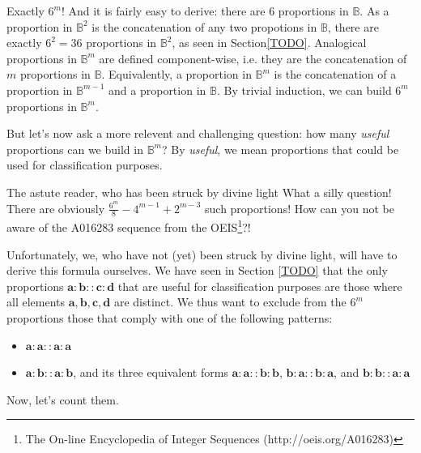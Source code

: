 Exactly $6^m$! And it is fairly easy to derive: there are $6$ proportions in
$\mathbb{B}$. As a proportion in $\mathbb{B}^2$ is the concatenation of any two
propotions in $\mathbb{B}$, there are exactly $6^2 = 36$ proportions in
$\mathbb{B}^2$, as seen in Section\ref{TODO}. Analogical proportions in
$\mathbb{B}^m$ are defined component-wise, i.e. they are the concatenation of
$m$ proportions in $\mathbb{B}$. Equivalently, a proportion in
$\mathbb{B}^m$ is the concatenation of a proportion in $\mathbb{B}^{m - 1}$ and
a proportion in $\mathbb{B}$. By trivial induction, we can build $6^m$
proportions in $\mathbb{B}^m$.

But let's now ask a more relevent and challenging question: how many
\textit{useful} proportions can we build in $\mathbb{B}^m$? By \textit{useful},
we mean proportions that could be used for classification purposes.

\begin{aquote}{The astute reader, who has been struck by divine light}
  What a silly question! There are obviously $\frac{6^m}{8} - 4^{m - 1} + 2^{m
  - 3}$ such proportions! How can you not be aware of the A016283 sequence from
  the OEIS\footnote{The On-line Encyclopedia of Integer Sequences
  (http://oeis.org/A016283)}?!
\end{aquote}

Unfortunately, we, who have not (yet) been struck by divine light, will have to
derive this formula ourselves. We have seen in Section \ref{TODO} that the only
proportions $\mathbf{a} : \mathbf{b} :: \mathbf{c} : \mathbf{d}$ that are
useful for classification purposes are those where all elements $\mathbf{a},
\mathbf{b}, \mathbf{c}, \mathbf{d}$ are distinct. We thus want to exclude from
the $6^m$ proportions those that comply with one of the following patterns:

\begin{itemize}
  \item $\mathbf{a}: \mathbf{a} :: \mathbf{a} : \mathbf{a}$
  \item $\mathbf{a}: \mathbf{b} :: \mathbf{a} : \mathbf{b}$, and its three
    equivalent forms $\mathbf{a}: \mathbf{a} :: \mathbf{b} : \mathbf{b}$,
    $\mathbf{b}: \mathbf{a} :: \mathbf{b} : \mathbf{a}$, and $\mathbf{b}:
    \mathbf{b} :: \mathbf{a} : \mathbf{a}$
\end{itemize}

Now, let's count them.

